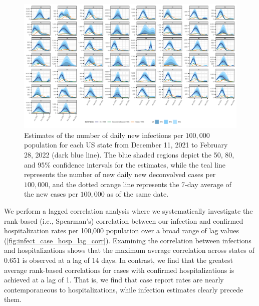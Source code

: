 \documentclass{article}
\begin{document}
\begin{landscape}
\thispagestyle{empty}
\begin{figure}[!tb]
    \includegraphics[width=.98\linewidth]{state_niauc_after_dec11.pdf} 
    \caption{Estimates of the number of daily new infections per
     $100,000$ population for each US state from December 11, 2021 to February 28, 2022
      (dark blue line). The blue shaded regions depict the 50, 80, and 95\% confidence 
      intervals for the estimates, while the teal line represents the 
      number of new daily new deconvolved cases per $100,000$, and the dotted 
      orange line represents the 7-day average of the new cases per $100,000$ as 
      of the same date.}
    \label{fig:state_est_after_dec1121}
\fillandplacepagenumber
\end{figure}
\end{landscape}

We perform a lagged correlation analysis where we systematically investigate the
rank-based (i.e., Spearman's) correlation between our infection and confirmed
hospitalization rates per 100,000 population over a broad range of lag values
(\autoref{fig:infect_case_hosp_lag_corr}). Examining the correlation between infections and
hospitalizations shows that the maximum average correlation across states of 0.651 is 
observed at a lag of 14 days. In contrast, we find that the greatest average
rank-based correlations for cases with confirmed hospitalizations is achieved at a lag of
1. That is, we find that case report rates are nearly contemporaneous to
hospitalizations, while infection estimates clearly precede them. 
\end{document}
